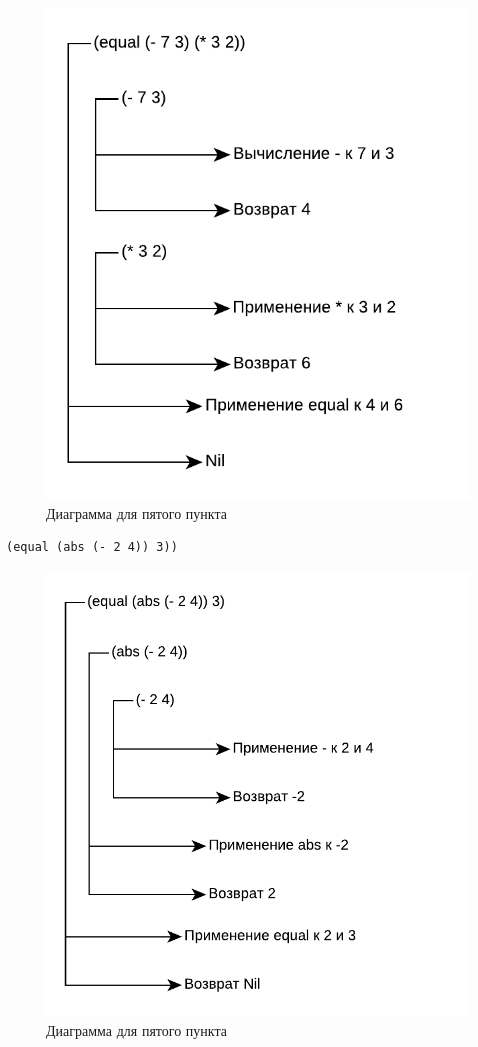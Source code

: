 \begin{figure}[H]
    \centering
    \includegraphics[scale=0.85]{data/pdf/task_5.pdf}
    \caption{Диаграмма для пятого пункта}
\end{figure}

\begin{lstlisting}
(equal (abs (- 2 4)) 3))
\end{lstlisting}

\begin{figure}[H]
    \centering
    \includegraphics[scale=0.85]{data/pdf/task_6.pdf}
    \caption{Диаграмма для пятого пункта}
\end{figure}

